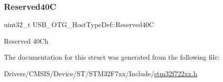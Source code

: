 \subsubsection{\texorpdfstring{Reserved40C}{Reserved40C}}
{\footnotesize\ttfamily uint32\+\_\+t U\+S\+B\+\_\+\+O\+T\+G\+\_\+\+Host\+Type\+Def\+::\+Reserved40C}

Reserved 40Ch 

The documentation for this struct was generated from the following file\+:\begin{DoxyCompactItemize}
\item 
Drivers/\+C\+M\+S\+I\+S/\+Device/\+S\+T/\+S\+T\+M32\+F7xx/\+Include/\mbox{\hyperlink{stm32f722xx_8h}{stm32f722xx.\+h}}\end{DoxyCompactItemize}
